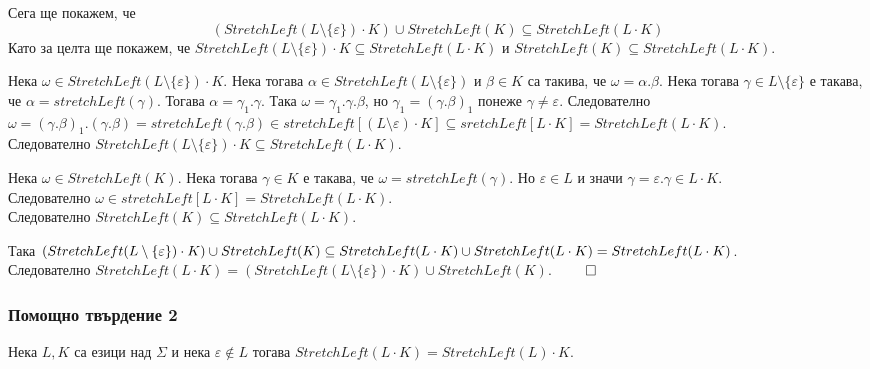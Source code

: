 \documentclass[12pt]{article}
\begin{document}
Сега ще покажем, че \[(StretchLeft(L \setminus \{\varepsilon\}) \cdot K) \cup StretchLeft(K) \subseteq StretchLeft(L \cdot K)\]
Като за целта ще покажем, че \(StretchLeft(L \setminus \{\varepsilon\}) \cdot K \subseteq StretchLeft(L \cdot K)\) и
\(StretchLeft(K) \subseteq StretchLeft(L \cdot K)\). \\

\vspace*{3mm}

\par Нека \(\omega \in StretchLeft(L \setminus \{\varepsilon\}) \cdot K\). Нека тогава \(\alpha \in StretchLeft(L \setminus \{\varepsilon\})\) и \(\beta \in K\)
са такива, че \(\omega = \alpha.\beta\). Нека тогава \(\gamma \in L \setminus \{\varepsilon\}\) е такава, че \(\alpha = stretchLeft(\gamma)\). Тогава \(\alpha = \gamma_1.\gamma\). Така \(\omega = \gamma_1.\gamma.\beta\),
но \(\gamma_1 = (\gamma.\beta)_1\) понеже \(\gamma \neq \varepsilon\).
Следователно \(\omega = (\gamma.\beta)_1.(\gamma.\beta) = stretchLeft(\gamma.\beta) \in stretchLeft[(L \setminus \varepsilon) \cdot K ] \subseteq sretchLeft[L \cdot K] = StretchLeft(L \cdot K)\). \\
Следователно \(StretchLeft(L \setminus \{\varepsilon\}) \cdot K \subseteq StretchLeft(L \cdot K)\). \\

\vspace*{3mm}

\par Нека \(\omega \in StretchLeft(K)\). Нека тогава \(\gamma \in K\) е такава, че \(\omega = stretchLeft(\gamma)\).
Но \(\varepsilon \in L\) и значи \(\gamma = \varepsilon.\gamma \in L \cdot K\). \\
Следователно \(\omega \in stretchLeft[L \cdot K] = StretchLeft(L \cdot K)\). \\
Следователно \(StretchLeft(K) \subseteq StretchLeft(L \cdot K)\).  \\

\vspace*{3mm}

\par Така \((StretchLeft(L \setminus \{\varepsilon\}) \cdot K) \cup StretchLeft(K) \subseteq \\ StretchLeft(L \cdot K) \cup StretchLeft(L \cdot K) = StretchLeft(L \cdot K)\). \\
Следователно \(StretchLeft(L \cdot K) = (StretchLeft(L \setminus \{\varepsilon\}) \cdot K) \cup StretchLeft(K)\). \(\qed\)

\subsubsection*{Помощно твърдение 2}
Нека \(L, K\) са езици над \(\Sigma\) и нека \(\varepsilon \notin L\)  тогава 
\(StretchLeft(L \cdot K) = StretchLeft(L) \cdot K\). \\
\end{document}
